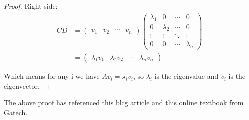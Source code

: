 \begin{proof}
   Right side:
   \begin{align*}
   CD & =  \begin{pmatrix}
             v_1 & v_2 & \cdots & v_n
           \end{pmatrix}
           \begin{pmatrix}
             \lambda_1 & 0 & \cdots & 0  \\  
             0 & \lambda_2 & \cdots & 0 \\
             \vdots & \vdots & \ddots & \vdots \\
             0 & 0 & \cdots & \lambda_n 
           \end{pmatrix} \\
        & = \begin{pmatrix}
           \lambda_1 v_1 & \lambda_2 v_2 & \cdots & \lambda_n v_n 
        \end{pmatrix}
   \end{align*}

   Which means for any i we have $Av_i = \lambda_i v_i$, so $\lambda_i$ is the eigenvalue and $v_i$  is the eigenvector.
\end{proof}

The above proof has referenced \href{https://leimao.github.io/blog/Matrix-Diagonalization-Theorem/}{this blog article} and \href{https://textbooks.math.gatech.edu/ila/diagonalization.html}{this online textbook from Gatech}.




